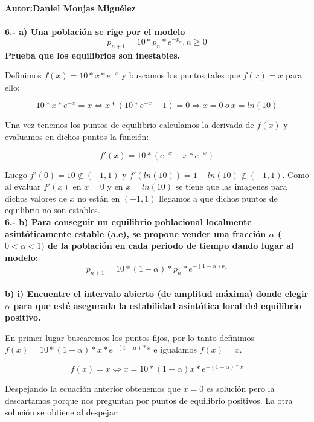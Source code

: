 \documentclass{article}
\author{Daniel Monjas Migu\'elez}
\begin{document}
\textbf{Autor:Daniel Monjas Miguélez} \\ \\

\textbf{6.- a) Una población se rige por el modelo 
\begin{equation}
p_{n+1}=10*p_n*e^{-p_n}, n \geq 0
\end{equation}
Prueba que los equilibrios son inestables.}

Definimos $f(x)=10*x*e^{-x}$ y buscamos los puntos tales que $f(x)=x$ para ello:


\begin{equation}
10*x*e^{-x}=x \Longleftrightarrow x*(10*e^{-x} - 1) = 0 \Rightarrow x=0 \> o \> x = ln(10)
\end{equation}

Una vez tenemos los puntos de equilibrio calculamos la derivada de $f(x)$ y evaluamos en dichos puntos la función:

\begin{equation}
f'(x)=10*(e^{-x}-x*e^{-x})
\end{equation}

Luego $f'(0)=10 \notin (-1,1)$ y $f'(ln(10))=1-ln(10) \notin (-1,1)$. Como al evaluar $f'(x)$ en $x=0$ y en $x=ln(10)$ se tiene que las imagenes para dichos valores de $x$ no están en $(-1,1)$ llegamos a que dichos puntos de equilibrio no son estables. \\

\textbf{6.- b) Para conseguir un equilibrio poblacional localmente asintóticamente estable (a.e), se propone vender una fracción $\alpha$ ($0 < \alpha < 1)$ de la población en cada periodo de tiempo dando lugar al modelo: 
\begin{equation}
p_{n+1}=10*(1-\alpha)*p_n*e^{-(1-\alpha)p_n}
\end{equation} 
} \\

\textbf{b) i) Encuentre el intervalo abierto (de amplitud máxima) donde elegir $\alpha$ para que esté asegurada la estabilidad asintótica local del equilibrio positivo.}

En primer lugar buscaremos los puntos fijos, por lo tanto definimos $f(x)=10*(1-\alpha)*x*e^{-(1-\alpha)*x}$  e igualamos $f(x)=x$.

\begin{equation}
f(x) = x  \Longleftrightarrow x=10*(1-\alpha)x*e^{-(1-\alpha)*x}
\end{equation}

Despejando la ecuación anterior obtenemos que $x=0$ es solución pero la descartamos porque nos preguntan por puntos de equilibrio positivos. La otra solución se obtiene al despejar:
\end{document}

